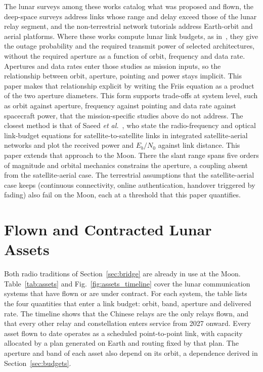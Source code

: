 \documentclass{IEEEoj}
\begin{document}
The lunar surveys among these works catalog what was proposed and flown, the deep-space surveys address links whose range and delay exceed those of the lunar relay segment, and the non-terrestrial network tutorials address Earth-orbit and aerial platforms. Where these works compute lunar link budgets, as in~\cite{cetin_taes2026}, they give the outage probability and the required transmit power of selected architectures, without the required aperture as a function of orbit, frequency and data rate. Apertures and data rates enter those studies as mission inputs, so the relationship between orbit, aperture, pointing and power stays implicit. This paper makes that relationship explicit by writing the Friis equation as a product of the two aperture diameters. This form supports trade-offs at system level, such as orbit against aperture, frequency against pointing and data rate against spacecraft power, that the mission-specific studies above do not address. The closest method is that of Saeed \emph{et al.}~\cite{saeed_ojcoms2021}, who state the radio-frequency and optical link-budget equations for satellite-to-satellite links in integrated satellite-aerial networks and plot the received power and $E_b/N_0$ against link distance. This paper extends that approach to the Moon. There the slant range spans five orders of magnitude and orbital mechanics constrains the aperture, a coupling absent from the satellite-aerial case. The terrestrial assumptions that the satellite-aerial case keeps (continuous connectivity, online authentication, handover triggered by fading) also fail on the Moon, each at a threshold that this paper quantifies.

\section{Flown and Contracted Lunar Assets}
\label{sec:assets}
Both radio traditions of Section~\ref{sec:bridge} are already in use at the Moon. Table~\ref{tab:assets} and Fig.~\ref{fig:assets_timeline} cover the lunar communication systems that have flown or are under contract. For each system, the table lists the four quantities that enter a link budget: orbit, band, aperture and delivered rate. The timeline shows that the Chinese relays are the only relays flown, and that every other relay and constellation enters service from 2027 onward. Every asset flown to date operates as a scheduled point-to-point link, with capacity allocated by a plan generated on Earth and routing fixed by that plan. The aperture and band of each asset also depend on its orbit, a dependence derived in Section~\ref{sec:budgets}.
\end{document}
